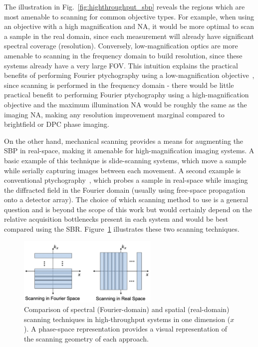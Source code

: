 The illustration in Fig.~\ref{fig:highthroughput_sbp} reveals the regions which are most amenable to scanning for common objective types. For example, when using an objective with a high magnification and NA, it would be more optimal to scan a sample in the real domain, since each measurement will already have significant spectral coverage (resolution). Conversely, low-magnification optics are more amenable to scanning in the frequency domain to build resolution, since these systems already have a very large FOV. This intuition explains the practical benefits of performing Fourier ptychography using a low-magnification objective~\cite{Zheng2013}, since scanning is performed in the frequency domain - there would be little practical benefit to performing Fourier ptychography using a high-magnification objective and the maximum illumination NA would be roughly the same as the imaging NA, making any resolution improvement marginal compared to brightfield or DPC phase imaging.

On the other hand, mechanical scanning provides a means for augmenting the SBP in real-space, making it amenable for high-magnification imaging systems. A basic example of this technique is slide-scanning systems, which move a sample while serially capturing images between each movement. A second example is conventional ptychography~\cite{rodenburg2004phase}, which probes a sample in real-space while imaging the diffracted field in the Fourier domain (usually using free-space propagation onto a detector array). The choice of which scanning method to use is a general question and is beyond the scope of this work but would certainly depend on the relative acquisition bottlenecks present in each system and would be best compared using the SBR. Figure~\ref{fig:highthroughput_scanning} illustrates these two scanning techniques.

\begin{figure}
  \centering
    \includegraphics[width=0.6\textwidth]{figures/fig_highthroughput_scanning.png}
  \caption{\label{fig:highthroughput_scanning} Comparison of spectral (Fourier-domain) and spatial (real-domain) scanning techniques in high-throughput systems in one dimension ($x$). A phase-space representation provides a visual representation of the scanning geometry of each approach.}
\end{figure}

